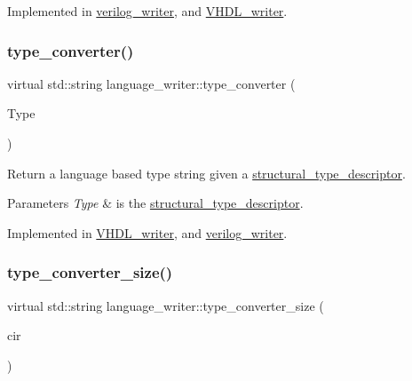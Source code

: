 Implemented in \hyperlink{classverilog__writer_a33625c1b43ea1ee1fa7331cde5d83c8b}{verilog\+\_\+writer}, and \hyperlink{structVHDL__writer_aa1655e8fca9245faa8c9bed5956d079a}{V\+H\+D\+L\+\_\+writer}.

\mbox{\label{classlanguage__writer_a1ac884fda2f8990edf61f914af7b04dd}} 
\subsubsection{\texorpdfstring{type\+\_\+converter()}{type\_converter()}}
{\footnotesize\ttfamily virtual std\+::string language\+\_\+writer\+::type\+\_\+converter (\begin{DoxyParamCaption}\item[{\hyperlink{structural__objects_8hpp_a219296792577e3292783725961506c83}{structural\+\_\+type\+\_\+descriptor\+Ref}}]{Type }\end{DoxyParamCaption})\hspace{0.3cm}{\ttfamily [pure virtual]}}



Return a language based type string given a \hyperlink{structstructural__type__descriptor}{structural\+\_\+type\+\_\+descriptor}. 


\begin{DoxyParams}{Parameters}
{\em Type} & is the \hyperlink{structstructural__type__descriptor}{structural\+\_\+type\+\_\+descriptor}. \\
\hline
\end{DoxyParams}


Implemented in \hyperlink{structVHDL__writer_aaadfd937b71dd556923b7e20e18cab60}{V\+H\+D\+L\+\_\+writer}, and \hyperlink{classverilog__writer_a20595dc1f543de374aeb4ec2f577971d}{verilog\+\_\+writer}.

\mbox{\label{classlanguage__writer_a154f45ed77a5dff96d190b4e1ccfa366}} 
\subsubsection{\texorpdfstring{type\+\_\+converter\+\_\+size()}{type\_converter\_size()}}
{\footnotesize\ttfamily virtual std\+::string language\+\_\+writer\+::type\+\_\+converter\+\_\+size (\begin{DoxyParamCaption}\item[{const \hyperlink{structural__objects_8hpp_a8ea5f8cc50ab8f4c31e2751074ff60b2}{structural\+\_\+object\+Ref} \&}]{cir }\end{DoxyParamCaption})\hspace{0.3cm}{\ttfamily [pure virtual]}}



